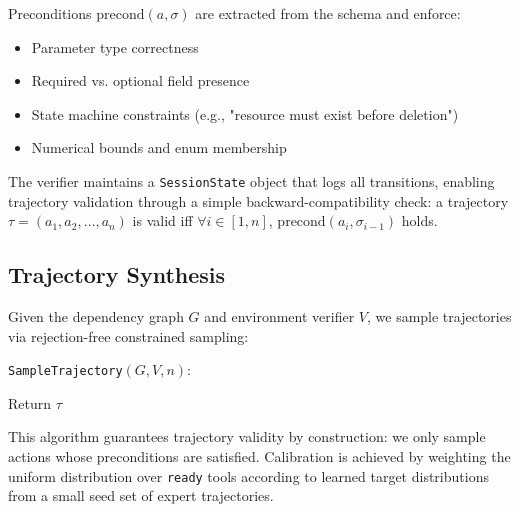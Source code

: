 \documentclass[11pt,a4paper]{article}
\begin{document}
Preconditions $\text{precond}(a, \sigma)$ are extracted from the schema and enforce:
\begin{itemize}
\item Parameter type correctness
\item Required vs. optional field presence
\item State machine constraints (e.g., "resource must exist before deletion")
\item Numerical bounds and enum membership
\end{itemize}

The verifier maintains a \texttt{SessionState} object that logs all transitions, enabling trajectory validation through a simple backward-compatibility check: a trajectory $\tau = (a_1, a_2, \ldots, a_n)$ is valid iff $\forall i \in [1,n]$, $\text{precond}(a_i, \sigma_{i-1})$ holds.

\subsection{Trajectory Synthesis}

Given the dependency graph $G$ and environment verifier $V$, we sample trajectories via rejection-free constrained sampling:

\begin{algorithm}
\texttt{SampleTrajectory}$(G, V, n)$:
\item Return $\tau$
\end{algorithm}

This algorithm guarantees trajectory validity by construction: we only sample actions whose preconditions are satisfied. Calibration is achieved by weighting the uniform distribution over \texttt{ready} tools according to learned target distributions from a small seed set of expert trajectories.
\end{document}
